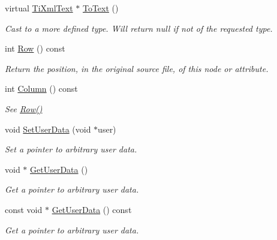 \begin{DoxyCompactItemize}
virtual \hyperlink{classTiXmlText}{TiXmlText} $\ast$ \hyperlink{classTiXmlNode_a3ddfbcac78fbea041fad57e5c6d60a03}{ToText} ()
\begin{DoxyCompactList}\small\item\em Cast to a more defined type. Will return null if not of the requested type. \item\end{DoxyCompactList}\item 
int \hyperlink{classTiXmlBase_a024bceb070188df92c2a8d8852dd0853}{Row} () const 
\begin{DoxyCompactList}\small\item\em Return the position, in the original source file, of this node or attribute. \item\end{DoxyCompactList}\item 
int \hyperlink{classTiXmlBase_ab54bfb9b70fe6dd276e7b279cab7f003}{Column} () const 
\begin{DoxyCompactList}\small\item\em See \hyperlink{classTiXmlBase_a024bceb070188df92c2a8d8852dd0853}{Row()} \item\end{DoxyCompactList}\item 
void \hyperlink{classTiXmlBase_ac6b3e0f790930d4970ec30764e937b5d}{SetUserData} (void $\ast$user)
\begin{DoxyCompactList}\small\item\em Set a pointer to arbitrary user data. \item\end{DoxyCompactList}\item 
void $\ast$ \hyperlink{classTiXmlBase_a6559a530ca6763fc301a14d77ed28c17}{GetUserData} ()
\begin{DoxyCompactList}\small\item\em Get a pointer to arbitrary user data. \item\end{DoxyCompactList}\item 
const void $\ast$ \hyperlink{classTiXmlBase_ad0120210e4680ef2088601753ce0ede4}{GetUserData} () const 
\begin{DoxyCompactList}\small\item\em Get a pointer to arbitrary user data. \item\end{DoxyCompactList}\end{DoxyCompactItemize}

